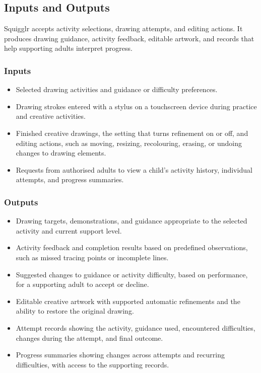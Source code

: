 \documentclass{article}
\begin{document}
\subsection{Inputs and Outputs}

Squigglr accepts activity selections, drawing attempts, and editing
actions. It produces drawing guidance, activity feedback, editable
artwork, and records that help supporting adults interpret progress.

\subsubsection{Inputs}

\begin{itemize}
    \item Selected drawing activities and guidance or difficulty
    preferences.
    \item Drawing strokes entered with a stylus on a touchscreen device
    during practice and creative activities.
    \item Finished creative drawings, the setting that turns refinement
    on or off, and editing actions, such as moving, resizing, recolouring, erasing, or undoing changes
    to drawing elements.
    \item Requests from authorised adults to view a child's activity
    history, individual attempts, and progress summaries.
\end{itemize}

\subsubsection{Outputs}

\begin{itemize}
    \item Drawing targets, demonstrations, and guidance appropriate
    to the selected activity and current support level.
    \item Activity feedback and completion results based on predefined
    observations, such as missed tracing points or incomplete lines.
    \item Suggested changes to guidance or activity difficulty, based
    on performance, for a supporting adult to accept or decline.
    \item Editable creative artwork with supported automatic
    refinements and the ability to restore the original drawing.
    \item Attempt records showing the activity, guidance used,
    encountered difficulties, changes during the attempt, and
    final outcome.
    \item Progress summaries showing changes across attempts and
    recurring difficulties, with access to the supporting records.
\end{itemize}
\end{document}
